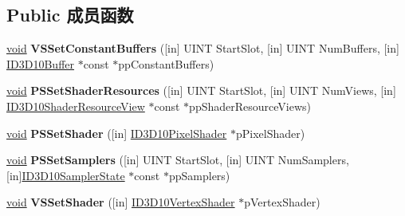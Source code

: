 \subsection*{Public 成员函数}
\begin{DoxyCompactItemize}
\item 
\mbox{\label{interface_i_d3_d10_device_ad6bcc53175eac5c6e9b53a4e86bba938}} 
\hyperlink{interfacevoid}{void} {\bfseries V\+S\+Set\+Constant\+Buffers} (\mbox{[}in\mbox{]} U\+I\+NT Start\+Slot, \mbox{[}in\mbox{]} U\+I\+NT Num\+Buffers, \mbox{[}in\mbox{]} \hyperlink{interface_i_d3_d10_buffer}{I\+D3\+D10\+Buffer} $\ast$const $\ast$pp\+Constant\+Buffers)
\item 
\mbox{\label{interface_i_d3_d10_device_ace4fe8170dcbbc314cff83d06c4d0123}} 
\hyperlink{interfacevoid}{void} {\bfseries P\+S\+Set\+Shader\+Resources} (\mbox{[}in\mbox{]} U\+I\+NT Start\+Slot, \mbox{[}in\mbox{]} U\+I\+NT Num\+Views, \mbox{[}in\mbox{]} \hyperlink{interface_i_d3_d10_shader_resource_view}{I\+D3\+D10\+Shader\+Resource\+View} $\ast$const $\ast$pp\+Shader\+Resource\+Views)
\item 
\mbox{\label{interface_i_d3_d10_device_acb049c5e99b194d089314c789343ea1f}} 
\hyperlink{interfacevoid}{void} {\bfseries P\+S\+Set\+Shader} (\mbox{[}in\mbox{]} \hyperlink{interface_i_d3_d10_pixel_shader}{I\+D3\+D10\+Pixel\+Shader} $\ast$p\+Pixel\+Shader)
\item 
\mbox{\label{interface_i_d3_d10_device_a5b1ab03de4a090c556af52dc9f8f8063}} 
\hyperlink{interfacevoid}{void} {\bfseries P\+S\+Set\+Samplers} (\mbox{[}in\mbox{]} U\+I\+NT Start\+Slot, \mbox{[}in\mbox{]} U\+I\+NT Num\+Samplers, \mbox{[}in\mbox{]}\hyperlink{interface_i_d3_d10_sampler_state}{I\+D3\+D10\+Sampler\+State} $\ast$const $\ast$pp\+Samplers)
\item 
\mbox{\label{interface_i_d3_d10_device_a980961c38b0a06080c51fcdd06db5b01}} 
\hyperlink{interfacevoid}{void} {\bfseries V\+S\+Set\+Shader} (\mbox{[}in\mbox{]} \hyperlink{interface_i_d3_d10_vertex_shader}{I\+D3\+D10\+Vertex\+Shader} $\ast$p\+Vertex\+Shader)
\item 
\mbox{\label{interface_i_d3_d10_device_a03a0b68a265bb52a60329b9c73aa79da}} 

\end{DoxyCompactItemize}
